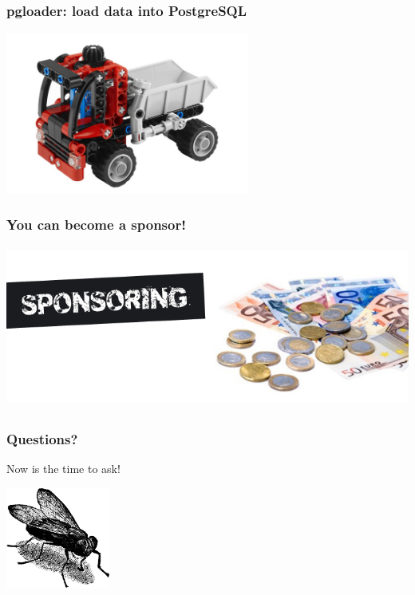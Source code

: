 \documentclass{beamer}
\begin{document}
\begin{frame}
  \frametitle{pgloader: load data into PostgreSQL}


  \begin{center}
    \includegraphics[height=2.1in]{pgloader.jpg}
  \end{center}
\end{frame}

\begin{frame}
  \frametitle{You can become a sponsor!}


  \begin{center}
    \includegraphics[height=2.1in]{sponsoring.jpg}
  \end{center}
\end{frame}

\begin{frame}
  \frametitle{Questions?}

  \begin{center}
    Now is the time to ask!
    \vfill

    \includegraphics[height=9em]{fly.png}
  \end{center}
\end{frame}
\end{document}
